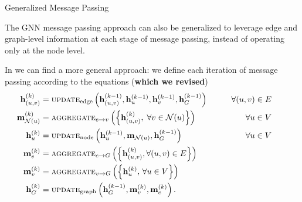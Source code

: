 \documentclass[10pt, aspectratio=169, compress, protectframetitle, handout]{beamer}
\begin{document}
\begin{frame}{Generalized Message Passing}
    
    The GNN message passing approach can also be generalized to leverage edge and graph-level information at each stage of message passing, instead of operating only at the node level. 
    
    In \cite{battaglia2018relational} we can find a \alert{more general approach}: we define each iteration of message passing according to the equations (\textbf{which we revised})
    \begin{align}
        \mathbf h^{(k)}_{(u,v)} &= \textsc{update}_\text{edge} \left( \mathbf h_{(u,v)}^{(k-1)}, \mathbf h_u^{(k-1)}, \mathbf h_v^{(k-1)}, \mathbf h_G^{(k-1)} \right) \qquad &\forall (u,v) \in E \qquad
        \label{eq:upedge} \\
        \mathbf m_{\mathcal N(u)}^{(k)} &= \textsc{aggregate}_{e \to v} \left( \left\{ \mathbf h_{(u,v)}^{(k)}, \; \forall v \in \mathcal N(u) \right\} \right) \qquad &\forall u \in V \qquad
        \label{eq:message} \\
        \mathbf h^{(k)}_u &= \textsc{update}_\text{node} \left( \mathbf h_u^{(k-1)}, \mathbf m_{\mathcal N(u)}, \mathbf h_G^{(k-1)} \right) \qquad &\forall u \in V \qquad
        \label{eq:upnode} \\
        \mathbf m_{e}^{(k)} &= \textsc{aggregate}_{e \to G} \left( \left\{ \mathbf h_{(u,v)}^{(k)}, \forall (u, v) \in E \right\} \right)
        \label{eq:aggeG} \\
        \mathbf m_{v}^{(k)} &= \textsc{aggregate}_{v \to G} \left( \left\{ \mathbf h_u^{(k)}, \, \forall u \in V \right\} \right)
        \label{eq:aggvG} \\
        \mathbf h^{(k)}_G &= \textsc{update}_\text{graph} \left(\mathbf h_G^{( k-1)}, \mathbf m_{v}^{(k)}, \mathbf m_{e}^{(k)} \right).
        \label{eq:upgraph}
    \end{align}
\end{frame}
\end{document}
